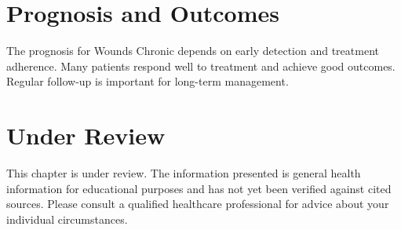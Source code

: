 \section*{Prognosis and Outcomes}
The prognosis for Wounds Chronic depends on early detection and treatment adherence. Many patients respond well to treatment and achieve good outcomes. Regular follow-up is important for long-term management.
\section*{Under Review}
This chapter is under review. The information presented is general health information for educational purposes and has not yet been verified against cited sources. Please consult a qualified healthcare professional for advice about your individual circumstances.


\clearpage

